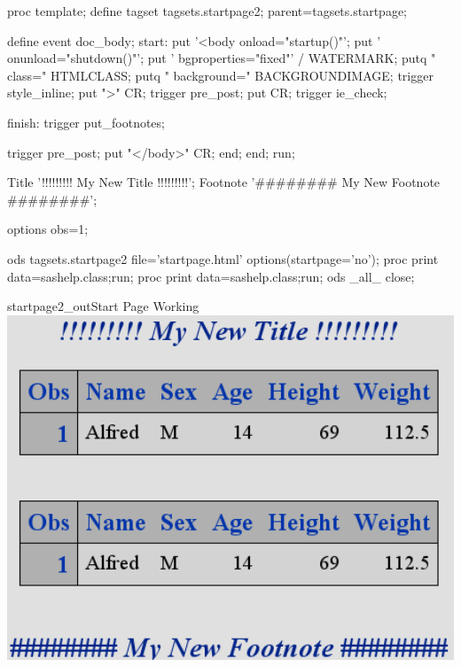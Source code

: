 \begin{sfvcode}
proc template;
    define tagset tagsets.startpage2;
        parent=tagsets.startpage;
        
        define event doc_body;
            start:
                put '<body onload="startup()"';
                put ' onunload="shutdown()"';
                put  ' bgproperties="fixed"' / WATERMARK;
                putq " class=" HTMLCLASS;
                putq " background=" BACKGROUNDIMAGE;
                trigger style_inline;
                put ">" CR;
                trigger pre_post;
                put          CR;
                trigger ie_check;

            finish:
                trigger put_footnotes;

                trigger pre_post;
                put "</body>" CR;
        end;
    end;
run;

Title '!!!!!!!!! My New Title !!!!!!!!!';
Footnote '######## My New Footnote ########';

options obs=1;

ods tagsets.startpage2 file='startpage.html' options(startpage='no');
proc print data=sashelp.class;run;
proc print data=sashelp.class;run;
ods _all_ close;
\end{sfvcode}

\begin{goutput}{startpage2_out}{Start Page Working}
\includegraphics[width=6in]{startpage2.png}
\end{goutput}


